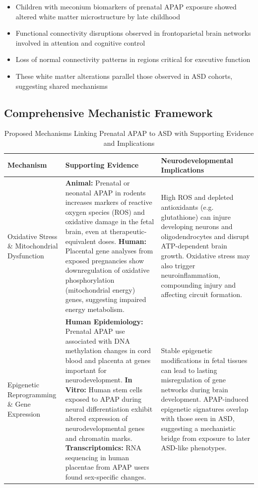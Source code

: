 \documentclass[11pt]{article}
\let\oldsubsection\subsection
\renewcommand{\subsection}[1]{\oldsubsection{#1}\setlength{\leftskip}{0.75em}}
\begin{document}
\begin{itemize}
\item Children with meconium biomarkers of prenatal APAP exposure showed altered white matter microstructure by late childhood
\item Functional connectivity disruptions observed in frontoparietal brain networks involved in attention and cognitive control
\item Loss of normal connectivity patterns in regions critical for executive function
\item These white matter alterations parallel those observed in ASD cohorts, suggesting shared mechanisms
\end{itemize}

\subsection{Comprehensive Mechanistic Framework}

\begin{table}[ht!]
\centering
\caption{Proposed Mechanisms Linking Prenatal APAP to ASD with Supporting Evidence and Implications}
\label{tab:mechanisms_comprehensive}
\begin{tabular}{p{3cm}p{7cm}p{5cm}}
\hline
\textbf{Mechanism} & \textbf{Supporting Evidence} & \textbf{Neurodevelopmental Implications} \\
\hline
Oxidative Stress \& Mitochondrial Dysfunction & 
\textbf{Animal:} Prenatal or neonatal APAP in rodents increases markers of reactive oxygen species (ROS) and oxidative damage in the fetal brain, even at therapeutic-equivalent doses.
\newline \textbf{Human:} Placental gene analyses from exposed pregnancies show downregulation of oxidative phosphorylation (mitochondrial energy) genes, suggesting impaired energy metabolism. & 
High ROS and depleted antioxidants (e.g. glutathione) can injure developing neurons and oligodendrocytes and disrupt ATP-dependent brain growth. Oxidative stress may also trigger neuroinflammation, compounding injury and affecting circuit formation. \\
\hline
Epigenetic Reprogramming \& Gene Expression & 
\textbf{Human Epidemiology:} Prenatal APAP use associated with DNA methylation changes in cord blood and placenta at genes important for neurodevelopment.
\newline \textbf{In Vitro:} Human stem cells exposed to APAP during neural differentiation exhibit altered expression of neurodevelopmental genes and chromatin marks.
\newline \textbf{Transcriptomics:} RNA sequencing in human placentae from APAP users found sex-specific changes. & 
Stable epigenetic modifications in fetal tissues can lead to lasting misregulation of gene networks during brain development. APAP-induced epigenetic signatures overlap with those seen in ASD, suggesting a mechanistic bridge from exposure to later ASD-like phenotypes. \\
\hline
\end{tabular}
\end{table}
\end{document}
